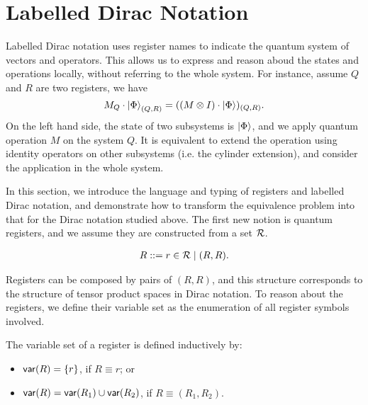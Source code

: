 


\section{Labelled Dirac Notation}
\label{sec: labelled}
Labelled Dirac notation uses register names to indicate the quantum system of vectors and operators. This allows us to express and reason aboud the states and operations locally, without referring to the whole system. For instance, assume $Q$ and $R$ are two registers, we have
\[
    M_Q \cdot \ket{\Phi}_{(Q, R)} = ((M \otimes I) \cdot \ket{\Phi})_{(Q, R)}.
\]
On the left hand side, the state of two subsystems is $\ket{\Phi}$, and we apply quantum operation $M$ on the system $Q$. It is equivalent to extend the operation using identity operators on other subsystems (i.e. the cylinder extension), and consider the application in the whole system.


In this section, we introduce the language and typing of registers and labelled Dirac notation, and demonstrate how to transform the equivalence problem into that for the Dirac notation studied above.
The first new notion is quantum registers, and we assume they are constructed from a set $\mathcal{R}$.
\begin{definition}
  \begin{align*}
    R ::= r\in\mathcal{R} \mid (R, R).
  \end{align*}
\end{definition}

Registers can be composed by pairs of $(R, R)$, and this structure corresponds to the structure of tensor product spaces in Dirac notation.
To reason about the registers, we define their variable set as the enumeration of all register symbols involved.

\begin{definition}
The variable set of a register is defined inductively by:
\begin{itemize}
    \item $\mathsf{var}(R) = \{r\}$, if $R\equiv r$; or
    \item $\mathsf{var}(R) = \mathsf{var}(R_1) \cup\mathsf{var}(R_2)$, if $R\equiv (R_1,R_2)$.
\end{itemize}
\end{definition}


